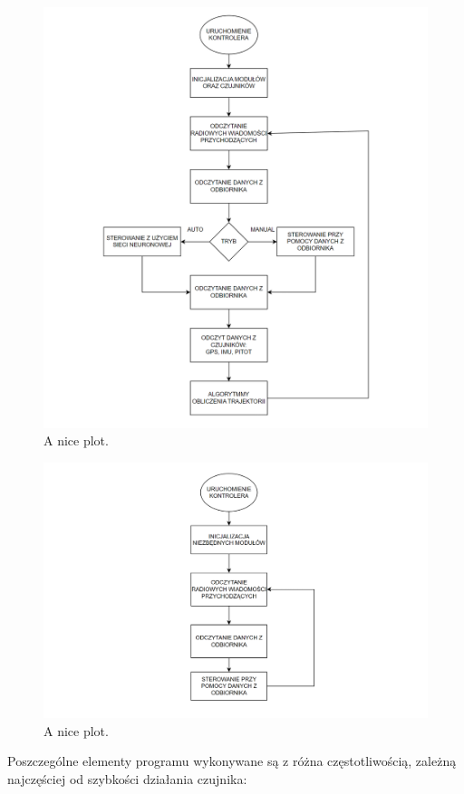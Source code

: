 \documentclass[12pt, a4paper]{article}
\begin{document}
    \begin{figure}[ht]
    \centering
    \includegraphics[width=1\textwidth]{diagram_blokowy}
    \caption{A nice plot.}
\end{figure}
   \begin{figure}[ht]
    \centering
    \includegraphics[width=1\textwidth]{diagram_emergency}
    \caption{A nice plot.}
\end{figure}
Poszczególne elementy programu wykonywane są z różna częstotliwością, zależną najczęściej od szybkości działania czujnika:
\end{document}
